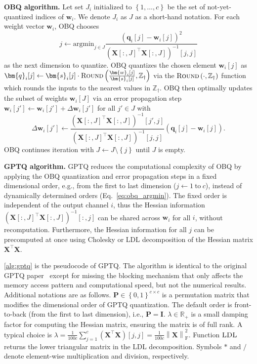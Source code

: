 \documentclass{article} %
\begin{document}
\textbf{OBQ algorithm.}
Let set $J_{i}$ initialized to $\left\{ 1, \dots, c \right\}$ be the set of not-yet-quantized indices of $\bm{w}_{i}$.
We denote $J_{i}$ as $J$ as a short-hand notation.
For each weight vector $\bm{w}_{i}$, OBQ chooses
\begin{equation}
j \leftarrow \mathrm{argmin}_{j \in J} \frac{\left( \bm{q}_{i} [j] - \bm{w}_{i} [j] \right)^{2}}{\left( \bm{X} [:, J]^{\top} \bm{X} [:, J] \right)^{-1} [j, j]}
\label{eq:obq_argmin}
\end{equation}
as the next dimension to quantize.
OBQ quantizes the chosen element $\bm{w}_{i} [j]$ as $\bm{q}_{i} [j] \leftarrow \bm{s}_{i} [j] \cdot \textsc{Round} \left( \frac{\bm{w}_{i} [j]}{\bm{s}_{i} [j]} , \mathbb{Z}_{\dagger} \right)$ via the $\textsc{Round} \left( \cdot , \mathbb{Z}_{\dagger} \right)$ function which rounds the inputs to the nearest values in $\mathbb{Z}_{\dagger}$. OBQ then optimally updates the subset of weights $\bm{w}_{i} [J]$ via an error propagation step $\bm{w}_{i} [j'] \leftarrow \bm{w}_{i} [j'] + \Delta \bm{w}_{i} [j']$ for all $j' \in J$ with
\begin{equation}
\Delta \bm{w}_{i} [j'] \leftarrow \frac{\left( \bm{X} [:, J]^\top \bm{X} [:, J] \right)^{-1}[j', j]}{\left( \bm{X} [:, J]^\top \bm{X} [:, J] \right)^{-1}[j, j]} \left( \bm{q}_{i} [j] - \bm{w}_{i} [j] \right)
\label{eq:obq_update} .
\end{equation}
OBQ continues iteration with $J \leftarrow J \setminus \left\{ j \right\}$ until $J$ is empty.

\textbf{GPTQ algorithm.}
GPTQ reduces the computational complexity of OBQ by applying the OBQ quantization and error propagation steps in a fixed dimensional order, e.g., from the first to last dimension ($j \leftarrow 1 \mathrm{\ to\ } c$), instead of dynamically determined orders (Eq.~\ref{eq:obq_argmin}).
The fixed order is independent of the output channel $i$, thus the Hessian information $\left( \bm{X} [:, J]^\top \bm{X} [:, J] \right)^{-1} [:, j]$ can be shared across $\bm{w}_{i}$ for all $i$, without recomputation.
Furthermore, the Hessian information for all $j$ can be precomputed at once using Cholesky or LDL decomposition of the Hessian matrix $\bm{X}^\top \bm{X}$.

\cref{alg:gptq} is the pseudocode of GPTQ.
The algorithm is identical to the original GPTQ paper~\citep{frantar2023optq} except for missing the blocking mechanism that only affects the memory access pattern and computational speed, but not the numerical results.
Additional notations are as follows.
$\bm{P} \in \left\{ 0 , 1 \right\}^{c \times c}$ is a permutation matrix that modifies the dimensional order of GPTQ quantization. The default order is front-to-back (from the first to last dimension), i.e., $\bm{P} = \mathbf{I}$.
$\lambda \in \mathbb{R}_{+}$ is a small damping factor for computing the Hessian matrix, ensuring the matrix is of full rank.
A typical choice is $\lambda = \frac{1}{100 c} \sum_{j=1}^{c} \left( \bm{X}^\top \bm{X} \right) [j, j] = \frac{1}{100 c} \left\| \bm{X} \right\|_{\mathrm{F}}^{2}$.
Function $\textsc{LDL}$ returns the lower triangular matrix in the LDL decomposition.
Symbols $*$ and $/$ denote element-wise multiplication and division, respectively.
\end{document}
